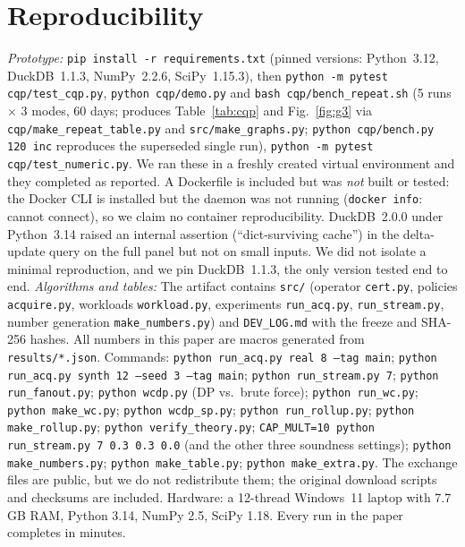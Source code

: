 \documentclass[conference]{IEEEtran}
\begin{document}
\section{Reproducibility}
\label{sec:repro}
\emph{Prototype:} \texttt{pip install -r requirements.txt} (pinned versions: Python~3.12, DuckDB~1.1.3, NumPy~2.2.6,
SciPy~1.15.3), then \texttt{python -m pytest cqp/test\_cqp.py}, \texttt{python cqp/demo.py} and
\texttt{bash cqp/bench\_repeat.sh} (5 runs $\times$ 3 modes, 60 days; produces Table~\ref{tab:cqp} and Fig.~\ref{fig:g3} via
\texttt{cqp/make\_repeat\_table.py} and \texttt{src/make\_graphs.py}; \texttt{python cqp/bench.py 120 inc} reproduces the superseded single run), \texttt{python -m pytest cqp/test\_numeric.py}. We ran these in a freshly created virtual environment and they completed as reported. A
Dockerfile is included but was \emph{not} built or tested: the Docker CLI is installed but the daemon was not
running (\texttt{docker info}: cannot connect), so we claim no container reproducibility. DuckDB~2.0.0 under Python~3.14 raised an internal assertion (``dict-surviving cache'') in
the delta-update query on the full panel but not on small inputs. We did not isolate a minimal reproduction, and we pin
DuckDB~1.1.3, the only version tested end to end.
\emph{Algorithms and tables:}
The artifact contains \texttt{src/} (operator \texttt{cert.py}, policies \texttt{acquire.py}, workloads
\texttt{workload.py}, experiments \texttt{run\_acq.py}, \texttt{run\_stream.py}, number generation
\texttt{make\_numbers.py}) and \texttt{DEV\_LOG.md} with the freeze and SHA-256 hashes. All numbers in this paper are
macros generated from \texttt{results/*.json}. Commands: \texttt{python run\_acq.py real 8 --tag main};
\texttt{python run\_acq.py synth 12 --seed 3 --tag main}; \texttt{python run\_stream.py 7};
\texttt{python run\_fanout.py}; \texttt{python wcdp.py} (DP vs.\ brute force);
\texttt{python run\_wc.py}; \texttt{python make\_wc.py}; \texttt{python wcdp\_sp.py};
\texttt{python run\_rollup.py}; \texttt{python make\_rollup.py}; \texttt{python verify\_theory.py};
\texttt{CAP\_MULT=10 python run\_stream.py 7 0.3 0.3 0.0} (and the other three soundness settings);
\texttt{python make\_numbers.py}; \texttt{python make\_table.py}; \texttt{python make\_extra.py}. The exchange files are public, but we do not redistribute them; the
original download scripts and checksums are included. Hardware: a 12-thread Windows~11 laptop with 7.7\,GB RAM, Python
3.14, NumPy 2.5, SciPy 1.18. Every run in the paper completes in minutes.
\end{document}
